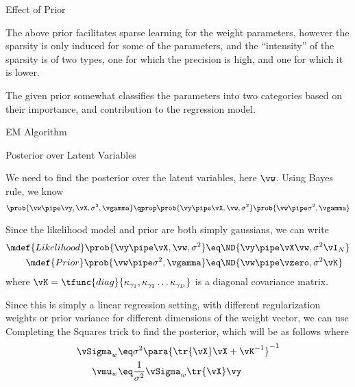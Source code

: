 \documentclass{article}
\begin{document}
\makeheader

\begin{question}

	\begin{qsection}{Effect of Prior}

		The above prior facilitates sparse learning for the weight parameters, however the sparsity is only induced for some of the parameters, and the ``intensity'' of the sparsity is of two types, one for which the precision is high, and one for which it is lower.

		The given prior somewhat classifies the parameters into two categories based on their importance, and contribution to the regression model.

	\end{qsection}

	\begin{qsection}{EM Algorithm}

		\begin{qsubsection}{Posterior over Latent Variables}

			We need to find the posterior over the latent variables, here $\vw$. Using Bayes rule, we know
			\begin{align*}
				\prob{\vw \pipe \vy, \vX, \sigma^2, \vgamma}	\qprop	\prob{\vy \pipe \vX, \vw, \sigma^2} \prob{\vw \pipe \sigma^2, \vgamma}
			\end{align*}

			Since the likelihood model and prior are both simply gaussians, we can write
			\begin{align*}
				\mdef{Likelihood}	\prob{\vy \pipe \vX, \vw, \sigma^2}	&\eq	\ND{\vy \pipe \vX \vw, \sigma^2 \vI_N} \\
				\mdef{Prior}		\prob{\vw \pipe \sigma^2, \vgamma}	&\eq	\ND{\vw \pipe \vzero, \sigma^2 \vK}
			\end{align*}
			where $\vK = \tfunc{diag}{\kappa_{\gamma_1}, \kappa_{\gamma_2} \dots \kappa_{\gamma_D}}$ is a diagonal covariance matrix.

			Since this is simply a linear regression setting, with different regularization weights or prior variance for different dimensions of the weight vector, we can use Completing the Squares trick to find the posterior, which will be as follows
			where
			\begin{align*}
				\vSigma_w	&\eq	\sigma^2 \para{\tr{\vX} \vX + \vK^{-1}}^{-1} \\
				\vmu_w		&\eq	\frac{1}{\sigma^2}	\vSigma_w \tr{\vX} \vy
			\end{align*}


\end{qsubsection}
\end{qsection}
\end{question}
\end{document}
